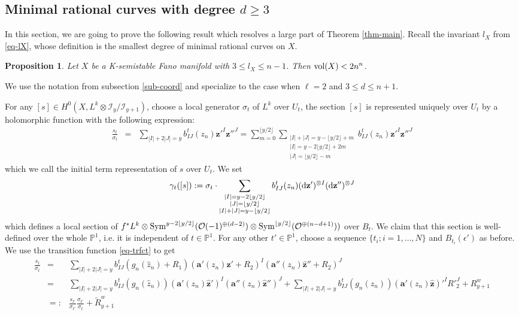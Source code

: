 \documentclass[12pt]{amsart}
\newtheorem{prop}[thm]{Proposition}
\theoremstyle{definition}
\def\dif{{\rm d}}
\def\vol{{\rm vol}}
\def\sym{{\rm Sym}}
\def\bz{{\mathbf{z}}}
\newcommand{\IP}{{\mathbb P}}
\newcommand{\CI}{{\mathcal I}}
\newcommand{\CO}{{\mathcal O}}
\begin{document}
\subsection{Minimal rational curves with degree $d\ge 3$}
In this section, we are going to prove the following result which resolves a large part of Theorem \ref{thm-main}. Recall the invariant $l_X$ from \eqref{eq-lX}, whose definition is the smallest degree of minimal rational curves on $X$. 
\begin{prop}\label{prop-3ton}
    Let $X$ be a K-semistable Fano manifold with $3\le l_X\le n-1$. Then $\vol(X)<2n^n$. 
\end{prop}
 We use the notation from subsection \ref{sub-coord} and specialize to the case when $\ell=2$ and $3\le d\le n+1$. 

For any $[s]\in H^0(X, L^k\otimes \CI_y/\CI_{y+1})$, choose a local generator $\sigma_t$ of $L^k$ over $U_t$, the section $[s]$ is represented uniquely over $U_t$ by a holomorphic function with the following expression:  
\begin{eqnarray*}
    \frac{s_t}{\sigma_t}&=&\sum_{|I|+2|J|=y}b^t_{IJ}(z_n)\bz'^I\bz''^J=\sum_{m=0}^{\lfloor y/2\rfloor}
    \sum_{\substack{|I|+|J|=y-\lfloor y/2\rfloor+m\\
    |I|=y-2\lfloor y/2\rfloor+2m\\ |J|=\lfloor y/2\rfloor-m
    }}b_{IJ}^t(z_n) \bz'^I \bz''^J
\end{eqnarray*}
which we call the initial term representation of $s$ over $U_t$. We set
\begin{equation*}
    \gamma_t([s]):=\sigma_t\cdot \sum_{\substack{|I|=y-2\lfloor y/2\rfloor \\
    |J|=\lfloor y/2 \rfloor\\   
    |I|+|J|=y-\lfloor y/2\rfloor}} b^t_{IJ}(z_n)(\dif\bz')^{\otimes I} (\dif \bz'')^{\otimes J}
\end{equation*}
which defines a local section of $f^*L^k\otimes \sym^{y-2 \lfloor y/2\rfloor}(\CO(-1)^{\oplus (d-2)})\otimes\sym^{\lfloor y/2\rfloor}(\CO^{\oplus(n-d+1)}))$ over $B_t$. 
We claim that this section is well-defined over the whole $\IP^1$, i.e. it is independent of $t\in \IP^1$. For any other $t'\in \IP^1$, choose a sequence $\{t_i; i=1, \dots, N\}$ and $B_{t_i}(\epsilon')$ as before. 
We use the transition function \eqref{eq-trfct} to get
\begin{eqnarray*}
    \frac{s_t}{\sigma_{t}}&=&
    \sum_{|I|+2|J|=y} b^{t}_{IJ}(g_n(\hat{z}_n)+R_1) (\mathbf{a}'(z_n)\hat{\bz}'+R_2)^I (\mathbf{a}''(z_n) \hat{\bz}''+R_2)^J\\
    &=&\sum_{|I|+2|J|=y} b^t_{IJ}(g_n(\hat{z}_n))(\mathbf{a}'(z_n)\hat{\bz}')^I (\mathbf{a}''(z_n)\hat{\bz}'')^J+\sum_{|I|+2|J|=y}b^t_{IJ}(g_n(\hat{z}_n))(\mathbf{a}'(z_n)\hat{\bz})'^I  R'^J_2+R^w_{y+1}\\
    &=:& \frac{s_{t'}}{\sigma_{t'}}\frac{\sigma_{t'}}{\sigma_t}+\tilde{R}^w_{y+1}
\end{eqnarray*}
\end{document}
